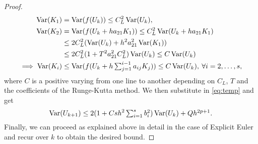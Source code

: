 \begin{proof}
\begin{equation}
	\begin{aligned}
		\operatorname{Var}(K_1) &= \operatorname{Var}(f(U_k)) \leq C_L^2 \operatorname{Var}(U_k), \\
		\operatorname{Var}(K_2) &= \operatorname{Var}(f(U_k + ha_{21}K_1)) \leq C_L^2 \operatorname{Var}(U_k + ha_{21}K_1) \\
		&\leq 2C_L^2 (\operatorname{Var}(U_k) + h^2a_{21}^2\operatorname{Var}(K_1)) \\
		&\leq 2C_L^2 (1 + T^2a_{21}^2C_L^2)\operatorname{Var}(U_k) \leq C \operatorname{Var}(U_k) \\
		\implies \operatorname{Var}(K_i) &\leq \operatorname{Var}(f(U_k + h \textstyle\sum_{j=1}^{i-1}a_{ij}K_j)) \leq C \operatorname{Var}(U_k), \: \forall i = 2, \ldots, s,
	\end{aligned}
\end{equation}
where $C$ is a positive varying from one line to another depending on $C_L$, $T$ and the coefficients of the Runge-Kutta method. We then substitute in \eqref{eq:temp} and get
\begin{equation}
	\operatorname{Var}(U_{k+1}) \leq 2 (1 + Csh^2\textstyle\sum_{i=1}^{s}b_i^2) \operatorname{Var}(U_k) + Q h^{2p + 1}. \\
\end{equation}
Finally, we can proceed as explained above in detail in the case of Explicit Euler and recur over $k$ to obtain the desired bound. 
\end{proof}

